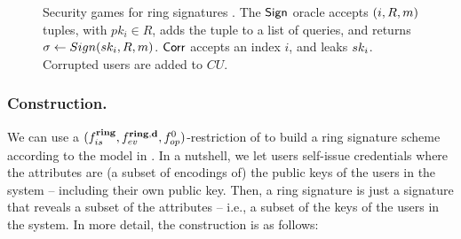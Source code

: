 \begin{figure}[ht!]
  \centering
  \caption{Security games for ring signatures \cite{bkm06}. The $\mathsf{Sign}$
    oracle accepts $(i,R,m)$ tuples, with $pk_i \in R$, adds the tuple to a
    list of queries, and returns $\sigma \gets Sign(sk_i,R,m)$.
    $\mathsf{Corr}$ accepts an index $i$, and leaks $sk_i$. Corrupted users are
    added to $CU$.}
  \label{fig:model-rs}  
\end{figure}


\subsubsection{\CUASRing Construction.} %
We can use a $(f_{is}^{\mathbf{ring}},f_{ev}^{\mathbf{ring},\mathbf{d}},f_{op}^0)$-restriction
of \CUASGenHideIss to build a ring signature scheme according to the model
in . In a nutshell, we let users self-issue
credentials where the attributes are (a subset of encodings of) the public keys
of the users in the system -- including their own public key. Then, a ring
signature is just a \CUASGenHideIss signature that reveals a subset of
the attributes -- i.e., a subset of the keys of the users in the system. In more
detail, the construction is as follows:

